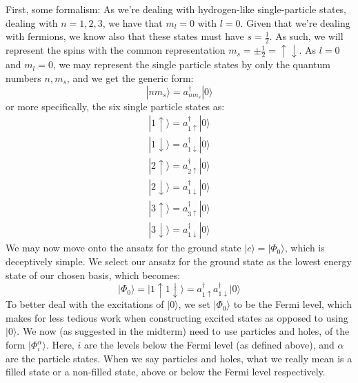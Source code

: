 \documentclass{article}
\begin{document}
\section{}
First, some formalism:
\newline
As we're dealing with hydrogen-like single-particle states, dealing with $n = 1, 2, 3$, we have that $m_l = 0$ with $l = 0$. Given that we're dealing with fermions, we know also that these states must have $s = \frac{1}{2}$. As such, we will represent the spins with the common representation $m_s = \pm \frac{1}{2} = \uparrow \downarrow$. \newline
As $l = 0$ and $m_l = 0$, we may represent the single particle states by only the quantum numbers $n, m_s$, and we get the generic form:
\begin{equation}
    | n m_s \rangle = a^\dagger _{n m_s} | 0 \rangle
\end{equation}
or more specifically, the six single particle states as:
\begin{gather*}
    | 1 \uparrow \rangle = a^\dagger_{1 \uparrow} |0 \rangle \\ 
    | 1 \downarrow \rangle = a^\dagger_{1 \downarrow} |0 \rangle \\
    | 2 \uparrow \rangle = a^\dagger_{2 \uparrow} |0 \rangle \\
    | 2 \downarrow \rangle = a^\dagger_{1 \downarrow} |0 \rangle \\
    | 3 \uparrow \rangle = a^\dagger_{3 \uparrow} |0 \rangle \\
    | 3 \downarrow \rangle = a^\dagger_{1 \downarrow} |0 \rangle
\end{gather*}
We may now move onto the ansatz for the ground state $|c\rangle = | \Phi_0 \rangle$, which is deceptively simple. \newline We select our ansatz for the ground state as the lowest energy state of our chosen basis, which becomes:
\begin{equation}
    | \Phi_0 \rangle = | 1\uparrow 1 \downarrow \rangle = a^\dagger_{1 \uparrow} a^\dagger_{1 \downarrow} | 0 \rangle 
\end{equation}
To better deal with the excitations of $| 0 \rangle$, we set $|\Phi_0 \rangle$ to be the Fermi level, which makes for less tedious work when constructing excited states as opposed to using $|0 \rangle$. We now (as suggested in the midterm) need to use particles and holes, of the form $| \Phi_i^\alpha \rangle$. Here, $i$ are the levels below the Fermi level (as defined above), and $\alpha$ are the particle states. When we say particles and holes, what we really mean is a filled state or a non-filled state, above or below the Fermi level respectively.
\end{document}

